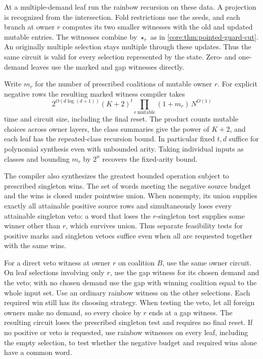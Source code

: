 At a multiple-demand leaf run the rainbow
recursion on these data. A projection is
recognized from the intersection. Fold
restrictions use the seeds, and each branch
at owner $r$ computes its two smaller
witnesses with the old and updated mutable
entries. The witnesses combine by $\star_r$
as in \cref{core:thm:pointed-guard-cut}.
An originally multiple selection stays
multiple through these updates. Thus the
same circuit is valid for every selection
represented by the state. Zero- and
one-demand leaves use the marked and gap
witnesses directly.

Write $m_r$ for the number of prescribed
coalitions of mutable owner $r$. For
explicit negative rows the resulting
marked witness compiler takes
\[
  2^{O(d\log(d+1))}(K+2)^t
    \prod_{r\ \mathrm{mutable}}(1+m_r)\,N^{O(1)}
\]
time and circuit size, including the final
reset. The product counts mutable choices
across owner layers, the class summaries
give the power of $K+2$, and each leaf has
the repeated-class recursion bound.
In particular fixed $t,d$ suffice for
polynomial synthesis even with unbounded
arity. Taking individual inputs as classes
and bounding $m_r$ by $2^n$ recovers the
fixed-arity bound.

The compiler also synthesizes the greatest
bounded operation subject to prescribed
singleton wins. The set of words meeting
the negative source budget and the wins is
closed under pointwise union. When nonempty,
its union supplies exactly all attainable
positive source rows and simultaneously
loses every attainable singleton veto:
a word that loses the $r$-singleton test
supplies some winner other than $r$, which
survives union. Thus separate feasibility
tests for positive marks and singleton
vetoes suffice even when all are requested
together with the same wins.

For a direct veto witness at owner $r$ on
coalition $B$, use the same owner circuit.
On leaf selections involving only $r$,
use the gap witness for its chosen demand
and the veto; with no chosen demand use
the gap with winning coalition equal to
the whole input set. Use an ordinary
rainbow witness on the other selections.
Each required win still has its choosing
strategy. When testing the veto, let all
foreign owners make no demand, so every
choice by $r$ ends at a gap witness.
The resulting circuit loses the prescribed
singleton test and requires no final
reset. If no positive or veto is requested,
use rainbow witnesses on every leaf,
including the empty selection, to test
whether the negative budget and required
wins alone have a common word.

